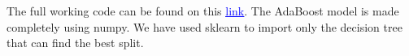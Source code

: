 \documentclass{homework}
\begin{document}
\section{}
The full working code can be found on this \href{https://github.com/IITH-Epoch/Handouts-2022-2023/blob/main/Linear%20Regression/Linear%20Regression.ipynb}{\textcolor{blue}{\underline{link}}}. The AdaBoost model is made completely using numpy. We have used sklearn to import only the decision tree that can find the best split.

\end{document}

